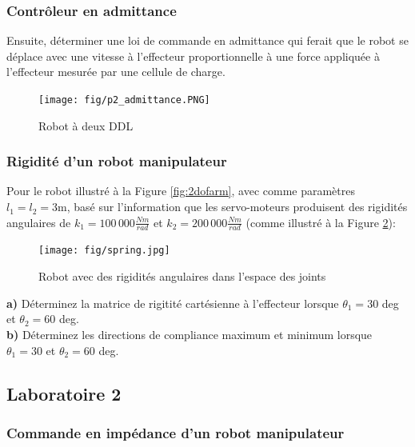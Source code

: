 \subsubsection{Contrôleur en admittance}
Ensuite, déterminer une loi de commande en admittance qui ferait que le robot se déplace avec une vitesse à l'effecteur proportionnelle à une force appliquée à l'effecteur mesurée par une cellule de charge.

\begin{figure}[H]
	\centering
		\texttt{[image: fig/p2\_admittance.PNG]}
	\caption{Robot à deux DDL}
	\label{fig:p2_admittance}
\end{figure}



\subsubsection{Rigidité d'un robot manipulateur}
Pour le robot illustré à la Figure \ref{fig:2dofarm}, avec comme paramètres $l_1=l_2=3$m, basé sur l'information que les servo-moteurs produisent des rigidités angulaires de $k_1 = 100\,000 \frac{Nm}{rad}$ et $k_2 = 200\,000 \frac{Nm}{rad}$ (comme illustré à la Figure \ref{fig:spring}):
\begin{figure}[htbp]
	\centering
		\texttt{[image: fig/spring.jpg]}
	\caption{Robot avec des rigidités angulaires dans l'espace des joints}
	\label{fig:spring}
\end{figure}

\textbf{a)} Déterminez la matrice de rigitité cartésienne à l'effecteur lorsque $\theta_1=30$ deg et $\theta_2=60$ deg.\\
\textbf{b)} Déterminez les directions de compliance maximum et minimum lorsque $\theta_1=30$ et $\theta_2=60$ deg. \\


\newpage
\subsection{Laboratoire 2}



\subsubsection{Commande en impédance d'un robot manipulateur}

